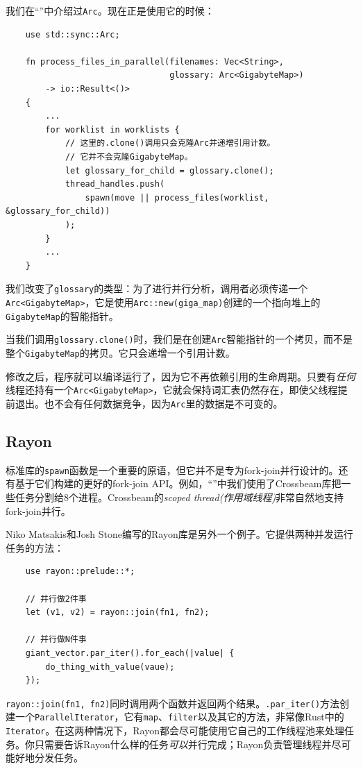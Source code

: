 我们在“”中介绍过\texttt{Arc}。现在正是使用它的时候：
\begin{verbatim}
    use std::sync::Arc;

    fn process_files_in_parallel(filenames: Vec<String>,
                                 glossary: Arc<GigabyteMap>)
        -> io::Result<()>
    {
        ...
        for worklist in worklists {
            // 这里的.clone()调用只会克隆Arc并递增引用计数。
            // 它并不会克隆GigabyteMap。
            let glossary_for_child = glossary.clone();
            thread_handles.push(
                spawn(move || process_files(worklist, &glossary_for_child))
            );
        }
        ...
    }
\end{verbatim}

我们改变了\texttt{glossary}的类型：为了进行并行分析，调用者必须传递一个\texttt{Arc<GigabyteMap>}，它是使用\texttt{Arc::new(giga\_map)}创建的一个指向堆上的\texttt{GigabyteMap}的智能指针。

当我们调用\texttt{glossary.clone()}时，我们是在创建\texttt{Arc}智能指针的一个拷贝，而不是整个\texttt{GigabyteMap}的拷贝。它只会递增一个引用计数。

修改之后，程序就可以编译运行了，因为它不再依赖引用的生命周期。只要有\emph{任何}线程还持有一个\texttt{Arc<GigabyteMap>}，它就会保持词汇表仍然存在，即使父线程提前退出。也不会有任何数据竞争，因为\texttt{Arc}里的数据是不可变的。

\subsection{Rayon}

标准库的\texttt{spawn}函数是一个重要的原语，但它并不是专为fork-join并行设计的。还有基于它们构建的更好的fork-join API。例如，“”中我们使用了Crossbeam库把一些任务分割给8个进程。Crossbeam的\emph{scoped thread(作用域线程)}非常自然地支持fork-join并行。

Niko Matsakis和Josh Stone编写的Rayon库是另外一个例子。它提供两种并发运行任务的方法：
\begin{verbatim}
    use rayon::prelude::*;

    // 并行做2件事
    let (v1, v2) = rayon::join(fn1, fn2);

    // 并行做N件事
    giant_vector.par_iter().for_each(|value| {
        do_thing_with_value(vaue);
    });
\end{verbatim}

\texttt{rayon::join(fn1, fn2)}同时调用两个函数并返回两个结果。\texttt{.par\_iter()}方法创建一个\texttt{ParallelIterator}，它有\texttt{map}、\texttt{filter}以及其它的方法，非常像Rust中的\texttt{Iterator}。在这两种情况下，Rayon都会尽可能使用它自己的工作线程池来处理任务。你只需要告诉Rayon什么样的任务\emph{可以}并行完成；Rayon负责管理线程并尽可能好地分发任务。


